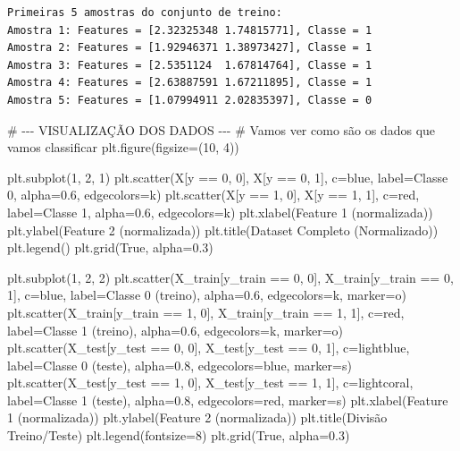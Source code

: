 \documentclass[
  brazilian,
]{report}
\newenvironment{Shaded}{\begin{snugshade}}{\end{snugshade}}
\newcommand{\NormalTok}[1]{\textcolor[rgb]{0.00,0.23,0.31}{#1}}
\begin{document}
\begin{verbatim}
Primeiras 5 amostras do conjunto de treino:
Amostra 1: Features = [2.32325348 1.74815771], Classe = 1
Amostra 2: Features = [1.92946371 1.38973427], Classe = 1
Amostra 3: Features = [2.5351124  1.67814764], Classe = 1
Amostra 4: Features = [2.63887591 1.67211895], Classe = 1
Amostra 5: Features = [1.07994911 2.02835397], Classe = 0
\end{verbatim}

\begin{Shaded}
\begin{Highlighting}[]

\NormalTok{\# {-}{-}{-} VISUALIZAÇÃO DOS DADOS {-}{-}{-}}
\NormalTok{\# Vamos ver como são os dados que vamos classificar}
\NormalTok{plt.figure(figsize=(10, 4))}

\NormalTok{plt.subplot(1, 2, 1)}
\NormalTok{plt.scatter(X[y == 0, 0], X[y == 0, 1], c=\textquotesingle{}blue\textquotesingle{}, label=\textquotesingle{}Classe 0\textquotesingle{}, alpha=0.6, edgecolors=\textquotesingle{}k\textquotesingle{})}
\NormalTok{plt.scatter(X[y == 1, 0], X[y == 1, 1], c=\textquotesingle{}red\textquotesingle{}, label=\textquotesingle{}Classe 1\textquotesingle{}, alpha=0.6, edgecolors=\textquotesingle{}k\textquotesingle{})}
\NormalTok{plt.xlabel(\textquotesingle{}Feature 1 (normalizada)\textquotesingle{})}
\NormalTok{plt.ylabel(\textquotesingle{}Feature 2 (normalizada)\textquotesingle{})}
\NormalTok{plt.title(\textquotesingle{}Dataset Completo (Normalizado)\textquotesingle{})}
\NormalTok{plt.legend()}
\NormalTok{plt.grid(True, alpha=0.3)}

\NormalTok{plt.subplot(1, 2, 2)}
\NormalTok{plt.scatter(X\_train[y\_train == 0, 0], X\_train[y\_train == 0, 1], c=\textquotesingle{}blue\textquotesingle{}, label=\textquotesingle{}Classe 0 (treino)\textquotesingle{}, alpha=0.6, edgecolors=\textquotesingle{}k\textquotesingle{}, marker=\textquotesingle{}o\textquotesingle{})}
\NormalTok{plt.scatter(X\_train[y\_train == 1, 0], X\_train[y\_train == 1, 1], c=\textquotesingle{}red\textquotesingle{}, label=\textquotesingle{}Classe 1 (treino)\textquotesingle{}, alpha=0.6, edgecolors=\textquotesingle{}k\textquotesingle{}, marker=\textquotesingle{}o\textquotesingle{})}
\NormalTok{plt.scatter(X\_test[y\_test == 0, 0], X\_test[y\_test == 0, 1], c=\textquotesingle{}lightblue\textquotesingle{}, label=\textquotesingle{}Classe 0 (teste)\textquotesingle{}, alpha=0.8, edgecolors=\textquotesingle{}blue\textquotesingle{}, marker=\textquotesingle{}s\textquotesingle{})}
\NormalTok{plt.scatter(X\_test[y\_test == 1, 0], X\_test[y\_test == 1, 1], c=\textquotesingle{}lightcoral\textquotesingle{}, label=\textquotesingle{}Classe 1 (teste)\textquotesingle{}, alpha=0.8, edgecolors=\textquotesingle{}red\textquotesingle{}, marker=\textquotesingle{}s\textquotesingle{})}
\NormalTok{plt.xlabel(\textquotesingle{}Feature 1 (normalizada)\textquotesingle{})}
\NormalTok{plt.ylabel(\textquotesingle{}Feature 2 (normalizada)\textquotesingle{})}
\NormalTok{plt.title(\textquotesingle{}Divisão Treino/Teste\textquotesingle{})}
\NormalTok{plt.legend(fontsize=8)}
\NormalTok{plt.grid(True, alpha=0.3)}


\end{Highlighting}
\end{Shaded}
\end{document}
